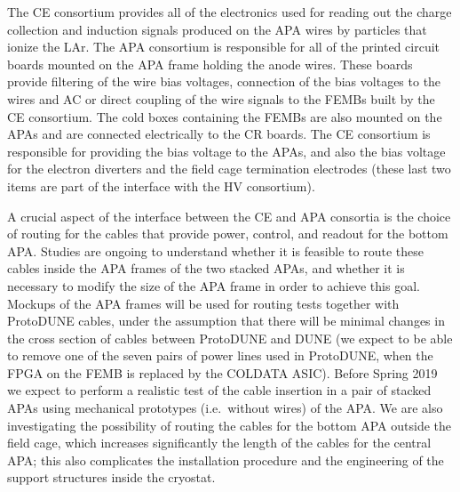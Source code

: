 The CE consortium provides all of the electronics used for reading out the charge
collection and induction signals produced on the APA wires by particles that ionize
the LAr. The APA consortium
is responsible for all of the printed circuit boards mounted on the APA frame
holding the anode wires. These boards provide filtering of the wire bias voltages,
connection of the bias voltages to the wires and AC or direct coupling of the
wire signals to the FEMBs built by the CE consortium.
The cold boxes containing the FEMBs are also mounted on the APAs and are connected
electrically to the CR boards. The CE consortium is responsible for providing the bias
voltage to the APAs, and also the bias voltage for the electron diverters and the field
cage termination electrodes (these last two items are part of the interface with
the HV consortium).

A crucial aspect of the interface between the CE and APA consortia
is the choice of routing for the cables that provide power, control, and readout
for the bottom APA. Studies are ongoing to understand whether it is feasible to
route these cables inside the APA frames of the two stacked APAs, and whether it
is necessary to modify the size of the APA frame in order to achieve this goal.
Mockups of the APA frames will be used for routing tests together with ProtoDUNE
cables, under the assumption that there will be minimal changes in the cross
section of cables between ProtoDUNE and DUNE (we expect to be able to remove one
of the seven pairs of power lines used in ProtoDUNE, when the FPGA on the
FEMB is replaced by the COLDATA ASIC). Before Spring 2019 we expect to perform
a realistic test of the cable insertion in a pair of stacked APAs using
mechanical prototypes (i.e.~without wires) of the APA. We are also investigating
the possibility of routing the cables for the bottom APA outside the field
cage, which increases significantly the length of the cables for the central
APA; this also complicates the installation procedure and the engineering of the
support structures inside the cryostat.
